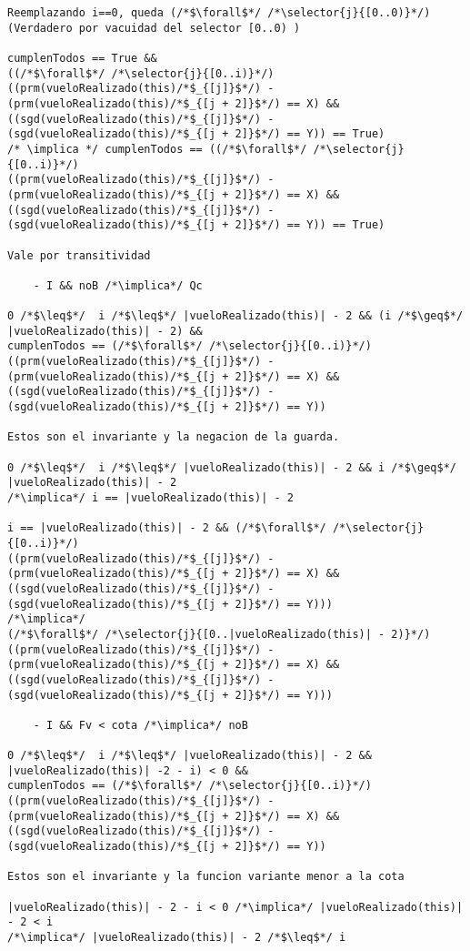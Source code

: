 \begin{lstlisting}
Reemplazando i==0, queda (/*$\forall$*/ /*\selector{j}{[0..0)}*/) (Verdadero por vacuidad del selector [0..0) )

cumplenTodos == True && 
((/*$\forall$*/ /*\selector{j}{[0..i)}*/) ((prm(vueloRealizado(this)/*$_{[j]}$*/) - (prm(vueloRealizado(this)/*$_{[j + 2]}$*/) == X) &&
((sgd(vueloRealizado(this)/*$_{[j]}$*/) - (sgd(vueloRealizado(this)/*$_{[j + 2]}$*/) == Y)) == True)
/* \implica */ cumplenTodos == ((/*$\forall$*/ /*\selector{j}{[0..i)}*/)
((prm(vueloRealizado(this)/*$_{[j]}$*/) - (prm(vueloRealizado(this)/*$_{[j + 2]}$*/) == X) &&
((sgd(vueloRealizado(this)/*$_{[j]}$*/) - (sgd(vueloRealizado(this)/*$_{[j + 2]}$*/) == Y)) == True)

Vale por transitividad

	- I && noB /*\implica*/ Qc

0 /*$\leq$*/  i /*$\leq$*/ |vueloRealizado(this)| - 2 && (i /*$\geq$*/ |vueloRealizado(this)| - 2) && 
cumplenTodos == (/*$\forall$*/ /*\selector{j}{[0..i)}*/)
((prm(vueloRealizado(this)/*$_{[j]}$*/) - (prm(vueloRealizado(this)/*$_{[j + 2]}$*/) == X) &&
((sgd(vueloRealizado(this)/*$_{[j]}$*/) - (sgd(vueloRealizado(this)/*$_{[j + 2]}$*/) == Y)) 

Estos son el invariante y la negacion de la guarda.

0 /*$\leq$*/  i /*$\leq$*/ |vueloRealizado(this)| - 2 && i /*$\geq$*/ |vueloRealizado(this)| - 2 
/*\implica*/ i == |vueloRealizado(this)| - 2

i == |vueloRealizado(this)| - 2 && (/*$\forall$*/ /*\selector{j}{[0..i)}*/)
((prm(vueloRealizado(this)/*$_{[j]}$*/) - (prm(vueloRealizado(this)/*$_{[j + 2]}$*/) == X) &&
((sgd(vueloRealizado(this)/*$_{[j]}$*/) - (sgd(vueloRealizado(this)/*$_{[j + 2]}$*/) == Y)))
/*\implica*/ 
(/*$\forall$*/ /*\selector{j}{[0..|vueloRealizado(this)| - 2)}*/)
((prm(vueloRealizado(this)/*$_{[j]}$*/) - (prm(vueloRealizado(this)/*$_{[j + 2]}$*/) == X) &&
((sgd(vueloRealizado(this)/*$_{[j]}$*/) - (sgd(vueloRealizado(this)/*$_{[j + 2]}$*/) == Y)))

	- I && Fv < cota /*\implica*/ noB

0 /*$\leq$*/  i /*$\leq$*/ |vueloRealizado(this)| - 2 && |vueloRealizado(this)| -2 - i) < 0 &&
cumplenTodos == (/*$\forall$*/ /*\selector{j}{[0..i)}*/)
((prm(vueloRealizado(this)/*$_{[j]}$*/) - (prm(vueloRealizado(this)/*$_{[j + 2]}$*/) == X) &&
((sgd(vueloRealizado(this)/*$_{[j]}$*/) - (sgd(vueloRealizado(this)/*$_{[j + 2]}$*/) == Y))  

Estos son el invariante y la funcion variante menor a la cota

|vueloRealizado(this)| - 2 - i < 0 /*\implica*/ |vueloRealizado(this)| - 2 < i 
/*\implica*/ |vueloRealizado(this)| - 2 /*$\leq$*/ i 



\end{lstlisting}
